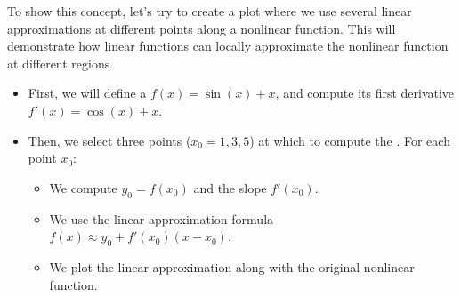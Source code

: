 \documentclass[letterpaper,10pt,english]{jupyterBook}
\begin{document}
\sphinxAtStartPar
To show this concept, let’s try to create a plot where we use several linear approximations at different points along a non\sphinxhyphen{}linear function. This will demonstrate how linear functions can locally approximate the non\sphinxhyphen{}linear function at different regions.
\begin{itemize}
\item {} 
\sphinxAtStartPar
First, we will define a  \(f(x) = \sin(x) + x\), and compute its first derivative \(f'(x) = \cos(x) + x\).

\item {} 
\sphinxAtStartPar
Then, we select three points (\(x_0 = 1, 3, 5\)) at which to compute the . For each point \(x_0\):
\begin{itemize}
\item {} 
\sphinxAtStartPar
We compute \(y_0 = f(x_0)\) and the slope \(f'(x_0)\).

\item {} 
\sphinxAtStartPar
We use the linear approximation formula \(f(x) \approx y_0 + f'(x_0)(x - x_0)\).

\item {} 
\sphinxAtStartPar
We plot the linear approximation along with the original non\sphinxhyphen{}linear function.

\end{itemize}

\end{itemize}
\end{document}
